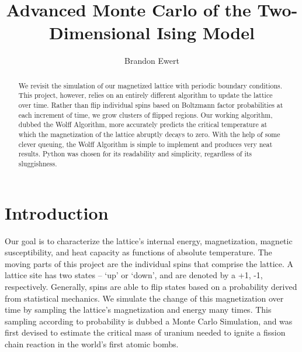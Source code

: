 \documentclass[a4paper]{article}
\title{Advanced Monte Carlo of the Two-Dimensional Ising Model}
\author{Brandon Ewert}
\begin{document}
\maketitle

\begin{abstract}
We revisit the simulation of our magnetized lattice with periodic boundary conditions. This project, however, relies on an entirely different algorithm to update the lattice over time. Rather than flip individual spins based on Boltzmann factor probabilities at each increment of time, we grow clusters of flipped regions. Our working algorithm, dubbed the Wolff Algorithm, more accurately predicts the critical temperature at which the magnetization of the lattice abruptly decays to zero. With the help of some clever queuing, the Wolff Algorithm is simple to implement and produces very neat results. Python was chosen for its readability and simplicity, regardless of its sluggishness. 
\end{abstract}

\section{Introduction}


Our goal is to characterize the lattice’s internal energy, magnetization, magnetic susceptibility, and heat capacity as functions of absolute temperature. The moving parts of this project are the individual spins that comprise the lattice. A lattice site has two states – ‘up’ or ‘down’, and are denoted by a +1, -1, respectively. Generally, spins are able to flip states based on a probability derived from statistical mechanics. We simulate the change of this magnetization over time by sampling the lattice’s magnetization and energy many times. This sampling according to probability is dubbed a Monte Carlo Simulation, and was first devised to estimate the critical mass of uranium needed to ignite a fission chain reaction in the world’s first atomic bombs. 
\end{document}
